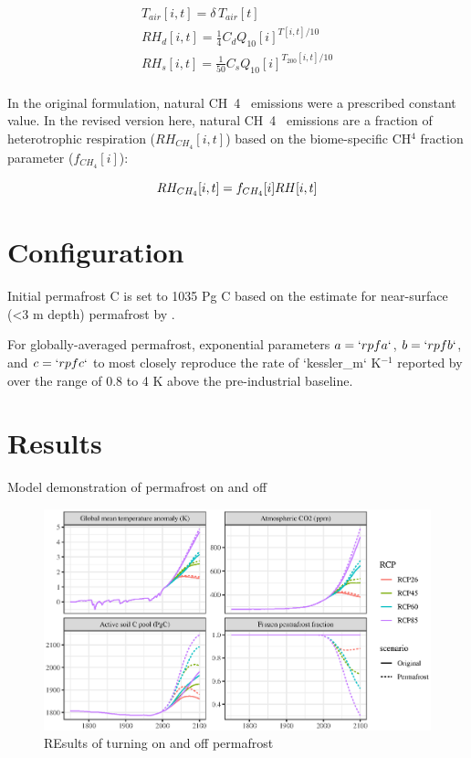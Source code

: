 \documentclass[essd, manuscript]{copernicus}
\begin{document}
\begin{gather*}

T_{air}[i,t] = \delta \, T_{air}[t] \\

RH_d[i,t] = \frac{1}{4} C_d Q_{10}[i] ^ {{T}[i,t] / 10} \\

RH_s[i,t] = \frac{1}{50} C_s Q_{10}[i] ^ {T_{200}[i,t] / 10} \\

\end{gather*}

In the original formulation, natural CH~4~ emissions were a prescribed constant value.
In the revised version here, natural CH~4~ emissions are a fraction of heterotrophic respiration ($RH_{CH_4}[i,t]$) based on the biome-specific CH$^4$ fraction parameter ($f_{CH_4}[i]$):

\begin{equation*}
    RH_{CH_4}[i,t] = f_{CH_4}[i] RH[i,t] \\
\end{equation*}

\section{Configuration}
Initial permafrost C is set to 1035 Pg C based on the estimate for near-surface (<3 m depth) permafrost by \citet{hugelius_2014_estimated}.


For globally-averaged permafrost, exponential parameters $a = `r pfa`$, $b = `r pfb`$, and $c = `r pfc`$ to most closely reproduce the rate of `kessler_m` K$^{-1}$ reported by \citet{kessler_2017_estimating} over the range of 0.8 \footnotemark to 4 K above the pre-industrial baseline.


\section{Results}
Model demonstration of permafrost on and off
\begin{figure}
    \centering
    \includegraphics[width=\textwidth]{figures/hector_4panel_results.eps}
    \caption{REsults of turning on and off permafrost}
    \label{fig:4panel}
\end{figure}
\end{document}
